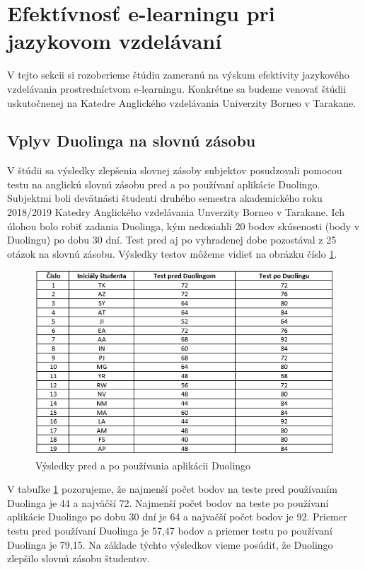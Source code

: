 \documentclass[10pt,oneside,slovak,a4paper]{article}
\begin{document}
\section{Efektívnosť e-learningu pri jazykovom vzdelávaní}
\label{3}
V tejto sekcii si rozoberieme štúdiu zameranú na výskum efektivity jazykového vzdelávania prostredníctvom e-learningu. Konkrétne sa budeme venovať štúdii uskutočnenej na Katedre Anglického vzdelávania Univerzity Borneo v Tarakane.

\subsection{Vplyv Duolinga na slovnú zásobu}
V štúdii sa výsledky zlepšenia slovnej zásoby subjektov posudzovali pomocou testu na anglickú slovnú zásobu pred a po používaní aplikácie Duolingo. Subjektmi boli devätnásti študenti druhého semestra akademického roku 2018/2019 Katedry Anglického vzdelávania Unverzity Borneo v Tarakane. Ich úlohou bolo robiť zadania Duolinga, kým nedosiahli 20 bodov skúsenosti (body v Duolingu) po dobu 30 dní. Test pred aj po vyhradenej dobe pozostával z 25 otázok na slovnú zásobu. Výsledky testov môžeme vidieť na obrázku číslo \ref{duo-studium}. \cite{duolingo}

\begin{figure}[h] %
\centering
\includegraphics[width=\textwidth]{duo_studium.png}
\caption{Výsledky pred a po používania aplikácii Duolingo\cite{duolingo}}
\label{duo-studium}
\end{figure}

V tabuľke \ref{duo-studium} pozorujeme, že najmenší počet bodov na teste pred používaním Duolinga je 44 a najväčší 72. Najmenší počet bodov na teste po používaní aplikácie  Duolingo po dobu 30 dní je 64 a najvačší počet bodov je 92. Priemer testu pred používaní Duolinga je 57,47 bodov a priemer testu po používaní Duolinga je 79,15. \cite{duolingo} Na základe týchto výsledkov vieme posúdiť, že Duolingo zlepšilo slovnú zásobu študentov.
\end{document}
